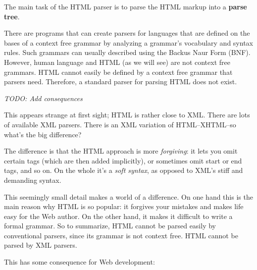 \documentclass[a4paper, justified, notoc]{tufte-handout} %
\begin{document}
The main task of the HTML parser is to parse the HTML markup into a \textbf{parse tree}.

There are programs that can create parsers for languages that are defined on the bases of a context free grammar by analyzing a grammar's vocabulary and syntax rules.
Such grammars can usually described using the Backus Naur Form (BNF). 
However, human language and HTML (as we will see) are not context free grammars. 
HTML cannot easily be defined by a context free grammar that parsers need.
Therefore, a standard parser for parsing HTML does not exist. 

\emph{TODO: Add consequences}


This appears strange at first sight; HTML is rather close to XML. There are lots of available XML parsers. There is an XML variation of HTML–XHTML–so what's the big difference?

The difference is that the HTML approach is more \emph{forgiving}: it lets you omit certain tags (which are then added implicitly), or sometimes omit start or end tags, and so on. On the whole it's a \emph{soft syntax}, as opposed to XML's stiff and demanding syntax.

This seemingly small detail makes a world of a difference. On one hand this is the main reason why HTML is so popular: it forgives your mistakes and makes life easy for the Web author. On the other hand, it makes it difficult to write a formal grammar. So to summarize, HTML cannot be parsed easily by conventional parsers, since its grammar is not context free. HTML cannot be parsed by XML parsers.

This has some consequence for Web development:
\end{document}

